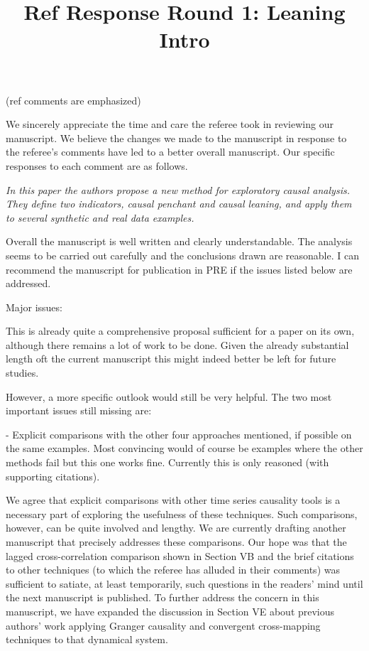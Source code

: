\documentclass[a4paper,11pt]{article}
\title{Ref Response Round 1: Leaning Intro}
\begin{document}

\noindent \hrulefill

\noindent (ref comments are emphasized)
\vspace{0.5cm}

We sincerely appreciate the time and care the referee took in reviewing our manuscript.  We believe the changes we made to the manuscript in response to the referee's comments have led to a better overall manuscript.  Our specific responses to each comment are as follows. 

\vspace{0.5cm}
{\em In this paper the authors propose a new method for exploratory causal
analysis. They define two indicators, causal penchant and causal
leaning, and apply them to several synthetic and real data examples.

Overall the manuscript is well written and clearly understandable. The
analysis seems to be carried out carefully and the conclusions drawn
are reasonable. I can recommend the manuscript for publication in PRE
if the issues listed below are addressed.

Major issues:

This is already quite a comprehensive proposal sufficient for a paper
on its own, although there remains a lot of work to be done. Given the
already substantial length oft the current manuscript this might
indeed better be left for future studies.

However, a more specific outlook would still be very helpful. The two
most important issues still missing are:

- Explicit comparisons with the other four approaches mentioned, if
possible on the same examples. Most convincing would of course be
examples where the other methods fail but this one works fine.
Currently this is only reasoned (with supporting citations).}
\vspace{0.5cm}

We agree that explicit comparisons with other time series causality tools is a necessary part of exploring the usefulness of these techniques.  Such comparisons, however, can be quite involved and lengthy.  We are currently drafting another manuscript that  precisely addresses these comparisons.  Our hope was that the lagged cross-correlation comparison shown in Section VB and the brief citations to other techniques (to which the referee has alluded in their comments) was sufficient to satiate, at least temporarily, such questions in the readers' mind until the next manuscript is published.  To further address the concern in this manuscript, we have expanded the discussion in Section VE about previous authors' work applying Granger causality and convergent cross-mapping techniques to that dynamical system.    
\end{document}
